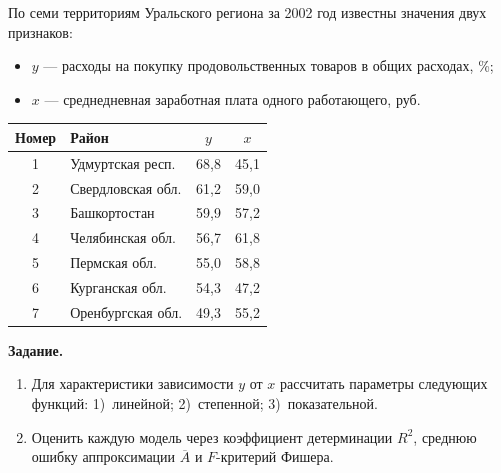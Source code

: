 
По семи территориям Уральского региона за 2002 год известны значения двух
признаков:
\begin{itemize}[leftmargin=2.2em, itemsep=1pt, topsep=3pt]
  \item $y$ — расходы на покупку продовольственных товаров в общих расходах, \%;
  \item $x$ — среднедневная заработная плата одного работающего, руб.
\end{itemize}

\begin{center}
\begin{tabular}{clcc}
\toprule
Номер & Район & $y$ & $x$ \\
\midrule
1 & Удмуртская респ.   & 68,8 & 45,1 \\
2 & Свердловская обл.  & 61,2 & 59,0 \\
3 & Башкортостан       & 59,9 & 57,2 \\
4 & Челябинская обл.   & 56,7 & 61,8 \\
5 & Пермская обл.      & 55,0 & 58,8 \\
6 & Курганская обл.    & 54,3 & 47,2 \\
7 & Оренбургская обл.  & 49,3 & 55,2 \\
\bottomrule
\end{tabular}
\end{center}

\noindent\textbf{Задание.}
\begin{enumerate}[label=\arabic*., leftmargin=2.2em, itemsep=3pt]
  \item Для характеристики зависимости $y$ от $x$ рассчитать параметры следующих
        функций: 1)~линейной; 2)~степенной; 3)~показательной.
  \item Оценить каждую модель через коэффициент детерминации $R^2$, среднюю
        ошибку аппроксимации $\overline{A}$ и $F$-критерий Фишера.
\end{enumerate}

